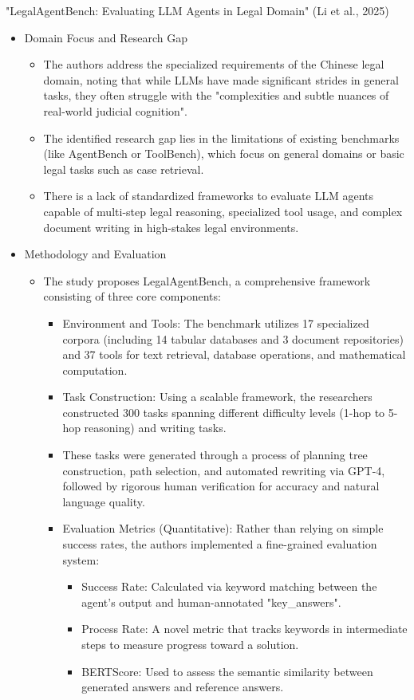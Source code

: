 "LegalAgentBench: Evaluating LLM Agents in Legal Domain" (Li et al., 2025) \cite{liLegalAgentBenchEvaluatingLLM2025}
\begin{itemize}
  \item Domain Focus and Research Gap
  \begin{itemize}
    \item The authors address the specialized requirements of the Chinese legal domain, noting that while LLMs have made significant strides in general tasks, they often struggle with the "complexities and subtle nuances of real-world judicial cognition".
    \item The identified research gap lies in the limitations of existing benchmarks (like AgentBench or ToolBench), which focus on general domains or basic legal tasks such as case retrieval.
    \item There is a lack of standardized frameworks to evaluate LLM agents capable of multi-step legal reasoning, specialized tool usage, and complex document writing in high-stakes legal environments.
  \end{itemize}

  \item Methodology and Evaluation
  \begin{itemize}
    \item The study proposes LegalAgentBench, a comprehensive framework consisting of three core components:
    \begin{itemize}
      \item Environment and Tools: The benchmark utilizes 17 specialized corpora (including 14 tabular databases and 3 document repositories) and 37 tools for text retrieval, database operations, and mathematical computation.
      \item Task Construction: Using a scalable framework, the researchers constructed 300 tasks spanning different difficulty levels (1-hop to 5-hop reasoning) and writing tasks.
      \item These tasks were generated through a process of planning tree construction, path selection, and automated rewriting via GPT-4, followed by rigorous human verification for accuracy and natural language quality.
      \item Evaluation Metrics (Quantitative): Rather than relying on simple success rates, the authors implemented a fine-grained evaluation system:
      \begin{itemize}
        \item Success Rate: Calculated via keyword matching between the agent's output and human-annotated "key\_answers".
        \item Process Rate: A novel metric that tracks keywords in intermediate steps to measure progress toward a solution.
        \item BERTScore: Used to assess the semantic similarity between generated answers and reference answers.
      \end{itemize}
    \end{itemize}
  \end{itemize}


\end{itemize}
